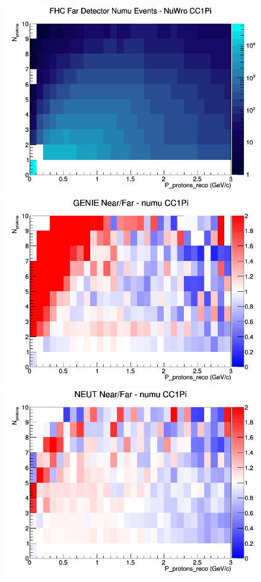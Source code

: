 \begin{figure}[h]
\endminipage
{}
\includegraphics[width=\linewidth]{eff_N_P/GAr/protons/CC1Pi_FHC_FD_numu_N_P_NuWro.png}
\endminipage
\newline
{}
\includegraphics[width=\linewidth]{eff_N_P/GAr/protons/ratios/CC1Pi_GENIE_numu_NF_N_P.png}
\endminipage
{}
\includegraphics[width=\linewidth]{eff_N_P/GAr/protons/ratios/CC1Pi_NEUT_numu_NF_N_P.png}

\end{figure}
